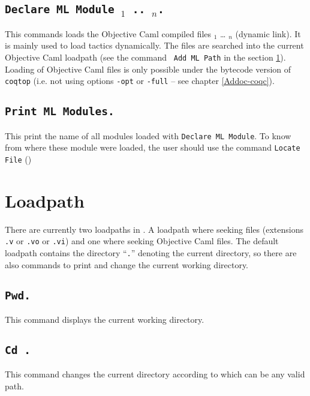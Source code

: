 \subsection{\tt Declare ML Module {\str$_1$} .. {\str$_n$}.}
This commands loads the Objective Caml compiled files {\str$_1$} \dots
{\str$_n$} (dynamic link). It is mainly used to load tactics
dynamically.
 The files are
searched into the current Objective Caml loadpath (see the command {\tt
Add ML Path} in the section \ref{loadpath}).  Loading of Objective Caml
files is only possible under the bytecode version of {\tt coqtop}
(i.e. not using options {\tt -opt} or {\tt -full} -- see chapter 
\ref{Addoc-coqc}).
\begin{ErrMsgs}
\item {}
\item {}
\end{ErrMsgs}

\subsection{\tt Print ML Modules.}
This print the name of all \ocaml{} modules loaded with \texttt{Declare
  ML Module}. To know from where these module were loaded, the user
should use the command \texttt{Locate File} (\pageref{Locate File})

\section{Loadpath}
\label{loadpath}

There are currently two loadpaths in \Coq. A loadpath where seeking
{\Coq} files (extensions {\tt .v} or {\tt .vo} or {\tt .vi}) and one where
seeking Objective Caml files. The default loadpath contains the
directory ``\texttt{.}'' denoting the current directory, so there are also
commands to print and change the current working directory.

\subsection{\tt Pwd.}\label{Pwd}
This command displays the current working directory.

\subsection{\tt Cd {\str}.}
This command changes the current directory according to {\str} 
which can be any valid path.

